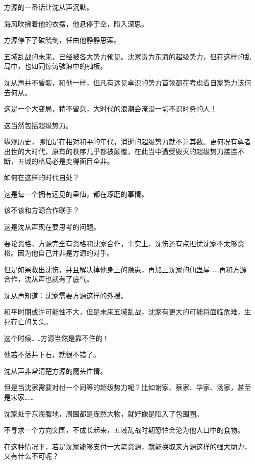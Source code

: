 
\begin{this_body}



方源的一番话让沈从声沉默。

海风吹拂着他的衣摆，他悬停于空，陷入深思。

方源停下了破晓剑，任由他静静思索。

五域乱战的未来，已经被各大势力预见。沈家贵为东海的超级势力，但在这样的乱局中，也如同惊涛骇浪中的舢板。

沈从声并不昏聩，和他一样，但凡有远见卓识的势力首领都在考虑着自家势力该何去何从。

这是一个大变局，稍不留意，大时代的浪潮会淹没一切不识时务的人！

这当然包括超级势力。

纵观历史，哪怕是在相对和平的年代，消逝的超级势力就不计其数。更何况有尊者出世的大时代，原有的秩序几乎都被颠覆，在此当中遭受毁灭的超级势力接连不断，五域的格局必是变得面目全非。

如何在这样的时代自处？

这是每一个拥有远见的蛊仙，都在琢磨的事情。

该不该和方源合作联手？

这是沈从声现在要思考的问题。

要论资格，方源完全有资格和沈家合作，事实上，沈伤还有点担忧沈家不太够资格。因为他自己并非是方源的对手。

但是如果救出沈伤，并且解决掉他身上的隐患，再加上沈家的仙蛊屋……再和方源合作，沈从声也就有了底气。

沈从声知道：沈家需要方源这样的外援。

和平时期或许可能性不大，但是未来五域乱战，沈家有更大的可能将面临危难，生死存亡的关头。

这个时候……方源当然是靠不住的！

他若不落井下石，就很不错了。

沈从声非常清楚方源的魔头性情。

但是当沈家需要对付一个同等的超级势力呢？比如谢家、蔡家、华家、汤家，甚至是宋家……

沈家处于东海腹地，周围都是庞然大物，就好像是陷入了包围圈。

不寻求一个方向突围，不成长起来，五域乱战时期恐怕会沦为他人口中的食物。

在这种情况下，若是沈家能够支付一大笔资源，就能换取来方源这样的强大助力，又有什么不可呢？


\end{this_body}
